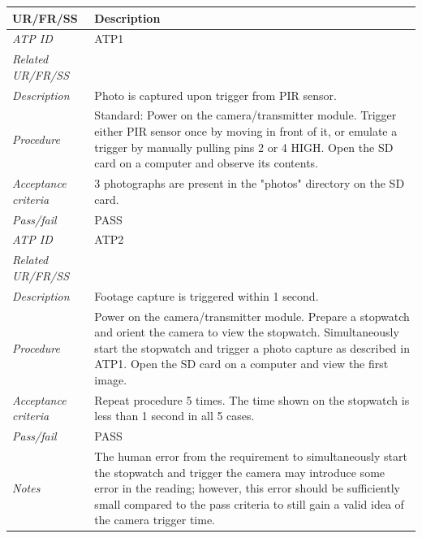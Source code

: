 \documentclass[class=report,11pt,crop=false]{standalone}
\begin{document}
\begin{table}[!ht]
    \centering
    \begin{scriptsize}
    \begin{tabularx}{\textwidth}{|p{} X|}
        
        \hline
        \textbf{UR/FR/SS} & \textbf{Description}\\ \hline
        \textit{ATP ID} & ATP1\\
        \textit{Related UR/FR/SS} &\\
        \textit{Description} & Photo is captured upon trigger from PIR sensor.\\
        \textit{Procedure} & Standard: Power on the camera/transmitter module. Trigger either PIR sensor once by moving in front of it, or emulate a trigger by manually pulling pins 2 or 4 HIGH. Open the SD card on a computer and observe its contents.\\
        \textit{Acceptance criteria} & 3 photographs are present in the "photos" directory on the SD card.\\ 
        \textit{Pass/fail} & PASS \\ \hline

        \textit{ATP ID} & ATP2 \\
        \textit{Related UR/FR/SS} & \\
        \textit{Description} & Footage capture is triggered within 1 second.\\
        \textit{Procedure} & Power on the camera/transmitter module. Prepare a stopwatch and orient the camera to view the stopwatch. Simultaneously start the stopwatch and trigger a photo capture as described in ATP1. Open the SD card on a computer and view the first image.\\
        \textit{Acceptance criteria} & Repeat procedure 5 times. The time shown on the stopwatch is less than 1 second in all 5 cases.\\ 
        \textit{Pass/fail} & PASS\\
        \textit{Notes} & The human error from the requirement to simultaneously start the stopwatch and trigger the camera may introduce some error in the reading; however, this error should be sufficiently small compared to the pass criteria to still gain a valid idea of the camera trigger time. \\ \hline


\end{tabularx}
\end{scriptsize}
\end{table}
\end{document}
